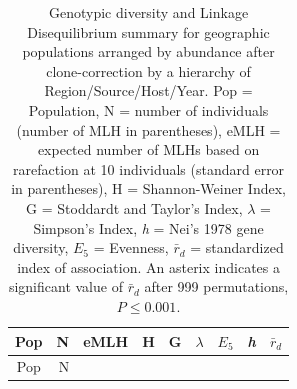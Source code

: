 \documentclass[fleqn,10pt,lineno]{wlpeerj} %
\theoremstyle{definition}
\theoremstyle{definition}
\theoremstyle{definition}
\theoremstyle{remark}
\begin{document}
\begin{longtable}[]{@{}crrrrllrl@{}}
\caption{\label{tab:iatab} Genotypic diversity and Linkage Disequilibrium
summary for geographic populations arranged by abundance after
clone-correction by a hierarchy of Region/Source/Host/Year. Pop =
Population, N = number of individuals (number of MLH in parentheses),
eMLH = expected number of MLHs based on rarefaction at 10 individuals
(standard error in parentheses), H = Shannon-Weiner Index, G = Stoddardt
and Taylor's Index, \(\lambda\) = Simpson's Index, \emph{h} = Nei's 1978
gene diversity, \(E_5\) = Evenness, \(\bar{r}_d\) = standardized index
of association. An asterix indicates a significant value of
\(\bar{r}_d\) after 999 permutations, \(P \leq 0.001\).}\tabularnewline
\toprule
\begin{minipage}[b]{0.12\columnwidth}\centering\strut
Pop\strut
\end{minipage} & \begin{minipage}[b]{0.08\columnwidth}\raggedleft\strut
N\strut
\end{minipage} & \begin{minipage}[b]{0.13\columnwidth}\raggedleft\strut
eMLH\strut
\end{minipage} & \begin{minipage}[b]{0.04\columnwidth}\raggedleft\strut
H\strut
\end{minipage} & \begin{minipage}[b]{0.05\columnwidth}\raggedleft\strut
G\strut
\end{minipage} & \begin{minipage}[b]{0.11\columnwidth}\raggedright\strut
\(\lambda\)\strut
\end{minipage} & \begin{minipage}[b]{0.06\columnwidth}\raggedright\strut
\(E_5\)\strut
\end{minipage} & \begin{minipage}[b]{0.06\columnwidth}\raggedleft\strut
\emph{h}\strut
\end{minipage} & \begin{minipage}[b]{0.07\columnwidth}\raggedright\strut
\(\bar{ r}_d\)\strut
\end{minipage}\tabularnewline
\midrule
\endfirsthead
\toprule
\begin{minipage}[b]{0.12\columnwidth}\centering\strut
Pop\strut
\end{minipage} & \begin{minipage}[b]{0.08\columnwidth}\raggedleft\strut
N\strut
\end{minipage} & \begin{minipage}[b]{0.13\columnwidth}\raggedleft\strut

\end{minipage}
\end{longtable}
\end{document}
